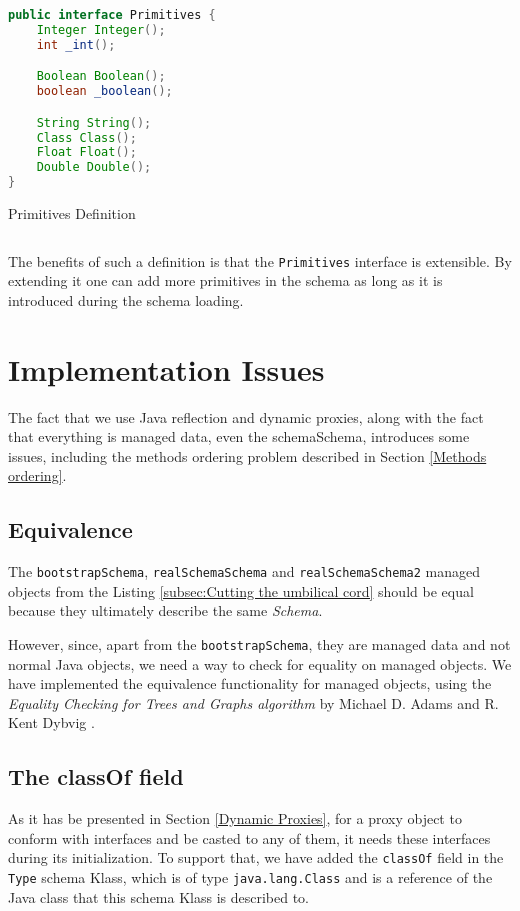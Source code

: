 \begin{sourcecode} [H]
	\begin{lstlisting}[language=Java, escapechar=|]
public interface Primitives {
	Integer Integer();
	int _int();

	Boolean Boolean();
	boolean _boolean();

	String String();
	Class Class();
	Float Float();
	Double Double();
}
	\end{lstlisting}
	\caption{Primitives Definition}
	\label{lst:Primitives Definition}
\end{sourcecode}

The benefits of such a definition is that the \texttt{Primitives} interface is extensible.
By extending it one can add more primitives in the schema as long as it is introduced during the schema loading.

\section{Implementation Issues}\label{Implementation Issues}
The fact that we use Java reflection and dynamic proxies, along with the fact that everything is managed data, even the schemaSchema, introduces some issues, including the methods ordering problem described in Section \ref{Methods ordering}.

\subsection{Equivalence}\label{Managed Object equivalence}
The \texttt{bootstrapSchema}, \texttt{realSchemaSchema} and \texttt{realSchemaSchema2} managed objects from the Listing \ref{subsec:Cutting the umbilical cord} should be equal because they ultimately describe the same \textit{Schema}.

However, since, apart from the \texttt{bootstrapSchema}, they are managed data and not normal Java objects, we need a way to check for equality on managed objects.
We have implemented the equivalence functionality for managed objects, using the \textit{Equality Checking for Trees and Graphs
algorithm} by Michael D. Adams and R. Kent Dybvig \cite{adams2008efficient}.

\subsection{The classOf field}\label{The classOf field}
As it has be presented in Section \ref{Dynamic Proxies}, for a proxy object to conform with interfaces and be casted to any of them, it needs these interfaces during its initialization.
To support that, we have added the \texttt{classOf} field in the \texttt{Type} schema Klass, which is of type \texttt{java.lang.Class} and is a reference of the Java class that this schema Klass is described to.

